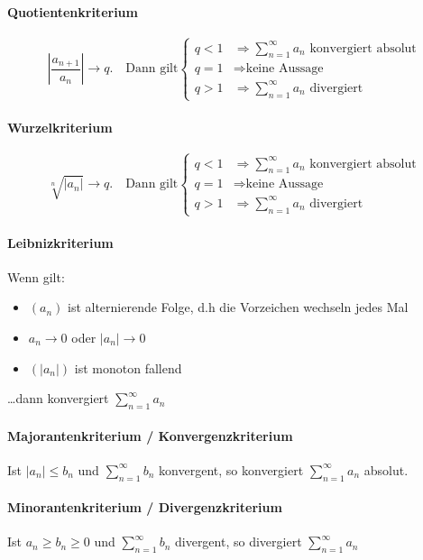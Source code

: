 \paragraph{Quotientenkriterium}
\[
\left| \frac{a_{n+1}}{a_n} \right| \to q. \quad \text{Dann gilt} \begin{cases}
q < 1 & \Rightarrow \sum_{n=1}^\infty a_n \text{ konvergiert absolut} \\
q = 1 & \Rightarrow \text{keine Aussage}\\
q > 1 & \Rightarrow \sum_{n=1}^\infty a_n \text{ divergiert}
\end{cases}
\]

\paragraph{Wurzelkriterium}
\[
\sqrt[n]{\left | a_n \right |} \to q. \quad \text{Dann gilt} \begin{cases}
q < 1 & \Rightarrow \sum_{n=1}^\infty a_n \text{ konvergiert absolut}\\
q = 1 & \Rightarrow \text{keine Aussage}\\
q > 1 & \Rightarrow \sum_{n=1}^\infty a_n \text{ divergiert}
\end{cases}
\]

\paragraph{Leibnizkriterium}
Wenn gilt:
\begin{itemize}
  \item $(a_n)$ ist alternierende Folge, d.h die Vorzeichen wechseln jedes Mal
  \item $a_n \to 0$ oder $|a_n| \to 0$
  \item $(|a_n|)$ ist monoton fallend
\end{itemize}
\ldots dann konvergiert $\sum_{n=1}^\infty a_n$

\paragraph{Majorantenkriterium / Konvergenzkriterium}
Ist $|a_n| \leq b_n$ und $\sum_{n=1}^\infty b_n$ konvergent, so konvergiert
$\sum_{n=1}^\infty a_n$ absolut.

\paragraph{Minorantenkriterium / Divergenzkriterium}
Ist $a_n \geq b_n \geq 0$ und $\sum_{n=1}^\infty b_n$ divergent, so divergiert
$\sum_{n=1}^\infty a_n$

